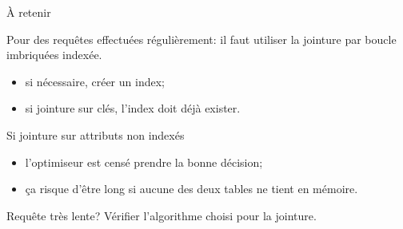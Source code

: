 \begin{frame}{À retenir}

Pour des requêtes effectuées régulièrement: il faut utiliser
la jointure par boucle imbriquées indexée.

\begin{itemize}
  \item si nécessaire, créer un index;
  \item si jointure sur clés, l'index doit \alert{déjà} exister.
\end{itemize}

\vfill

Si jointure sur attributs non indexés
\begin{itemize}
  \item l'optimiseur est censé prendre la bonne décision;
  \item ça risque d'être long si aucune des deux tables ne tient en mémoire.
\end{itemize}

\vfill

Requête très lente? \alert{Vérifier l'algorithme choisi pour la jointure.}
\end{frame}